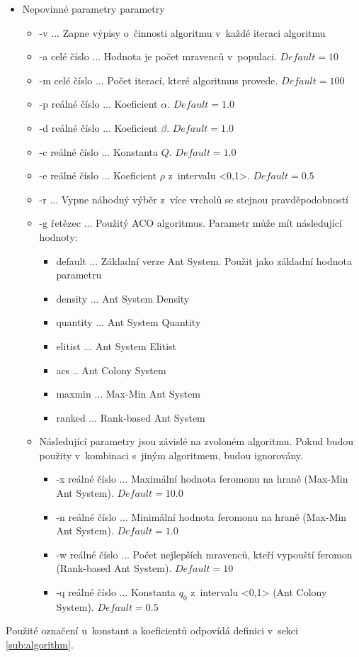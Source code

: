 \documentclass[a4paper, 12pt]{article}
\newcommand{\defVal}[1]{$Default=#1$}
\begin{document}
  \begin{itemize}
    \item Nepovinné parametry parametry
    \begin{itemize}
      \item -v ... Zapne výpisy o~činnosti algoritmu v~každé iteraci algoritmu
      \item -a celé číslo ... Hodnota je počet mravenců v~populaci. \defVal{10}
      \item -m celé číslo ... Počet iterací, které algoritmus provede. \defVal{100}
      \item -p reálné číslo ...  Koeficient $\alpha$. \defVal{1.0}
      \item -d reálné číslo ... Koeficient $\beta$. \defVal{1.0}
      \item -c reálné číslo ... Konstanta $Q$. \defVal{1.0}
      \item -e reálné číslo ... Koeficient $\rho$ z~intervalu <0,1>. \defVal{0.5}
      \item -r ... Vypne náhodný výběr z~více vrcholů se stejnou pravděpodobností
      \item -g řetězec ... Použitý ACO algoritmus. Parametr může mít následující hodnoty:
      \begin{itemize}
       \item default ... Základní verze Ant System. Použit jako základní hodnota parametru
       \item density ... Ant System Density
       \item quantity ... Ant System Quantity
       \item elitist ... Ant System Elitist
       \item acs .. Ant Colony System
       \item maxmin ... Max-Min Ant System
       \item ranked ... Rank-based Ant System
      \end{itemize}
      \item Následující parametry jsou závislé na zvoloném algoritmu. Pokud budou použity v~kombinaci s~jiným algoritmem, budou ignorovány.
      \begin{itemize}
        \item -x reálné číslo ... Maximální hodnota feromonu na hraně (Max-Min Ant System). \defVal{10.0}
        \item -n reálné číslo ... Minimální hodnota feromonu na hraně (Max-Min Ant System). \defVal{1.0}
        \item -w reálné číslo ... Počet nejlepších mravenců, kteří vypouští feromon (Rank-based Ant System). \defVal{10}
        \item -q reálné číslo ... Konstanta $q_0$ z~intervalu <0,1> (Ant Colony System). \defVal{0.5}
      \end{itemize}
    \end{itemize}
  \end{itemize}
Použité označení u~konstant a koeficientů odpovídá definici v~sekci \ref{sub:algorithm}.
\end{document}
